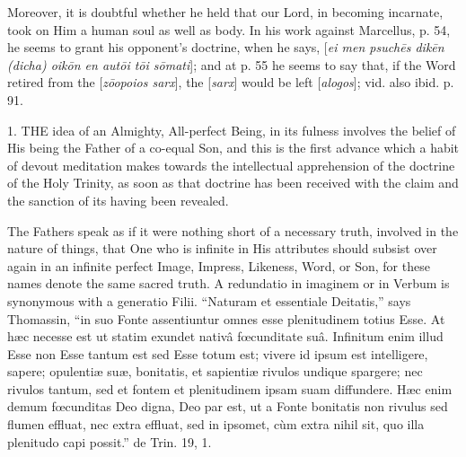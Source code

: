 Moreover, it is doubtful whether he held that our
Lord, in becoming incarnate, took on Him a human soul as well as body.
In his work against Marcellus, p. 54, he seems to grant his opponent's
doctrine, when he says, [\emph{ei men psuch\={e}s dik\={e}n (dicha)
oik\={o}n en aut\={o}i t\={o}i s\={o}mati}]; and at p.
55 he seems to say that, if the Word retired from the [\emph{z\={o}opoios
sarx}], the [\emph{sarx}] would be left [\emph{alogos}]; vid. also
ibid. p. 91.


1. THE
idea of an Almighty, All-perfect Being, in its fulness involves the
belief of His being the Father of a co-equal Son, and this is the
first advance which a habit of devout meditation makes towards the
intellectual apprehension of the doctrine of the Holy Trinity, as soon
as that doctrine has been received with the claim and the sanction of
its having been revealed.

The Fathers speak as if it were nothing short of
a necessary truth, involved in the nature of things, that One who is
infinite in His attributes should subsist over again in an infinite
perfect Image, Impress, Likeness, Word, or Son, for these names denote
the same sacred truth. A redundatio in imaginem or in Verbum is
synonymous with a generatio Filii. ``Naturam et essentiale Deitatis,''
says Thomassin, ``in suo Fonte assentiuntur omnes esse plenitudinem
totius Esse. At hæc necesse est ut statim exundet nativâ fœcunditate
suâ. Infinitum enim illud Esse non Esse tantum est sed Esse totum est;
vivere id ipsum est intelligere, sapere; opulentiæ suæ, bonitatis,
et sapientiæ rivulos undique spargere; nec rivulos tantum, sed et
fontem et plenitudinem ipsam suam diffundere. Hæc enim demum fœcunditas
Deo digna, Deo par est, ut a Fonte bonitatis non rivulus sed flumen
effluat, nec extra effluat, sed in ipsomet, cùm extra nihil
sit, quo illa plenitudo capi possit.'' de Trin. 19, 1.

